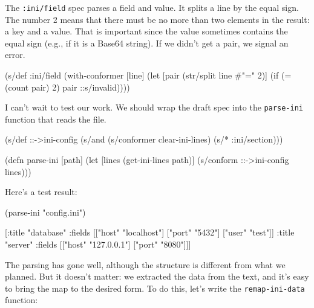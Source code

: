 \else

\begin{english}
\end{english}

\fi


The \verb|:ini/field| spec parses a field and value. It splits a line by the equal sign. The number 2 means that there must be no more than two elements in the result: a key and a value. That is important since the value sometimes contains the equal sign (e.g., if it is a Base64 string). If we didn't get a pair, we signal an error.

\begin{english}
  \begin{clojure}
(s/def :ini/field
  (with-conformer [line]
    (let [pair (str/split line #"=" 2)]
      (if (= (count pair) 2)
        pair
        ::s/invalid))))
  \end{clojure}
\end{english}

I can't wait to test our work. We should wrap the draft spec into the \verb|parse-ini| function that reads the file.

\begin{english}
  \begin{clojure}
(s/def ::->ini-config
  (s/and
   (s/conformer clear-ini-lines)
   (s/* :ini/section)))

(defn parse-ini [path]
  (let [lines (get-ini-lines path)]
    (s/conform ::->ini-config lines)))
  \end{clojure}
\end{english}

\noindent
Here's a test result:

\begin{english}
  \begin{clojure}
(parse-ini "config.ini")

[{:title "database"
  :fields [["host" "localhost"]
           ["port" "5432"]
           ["user" "test"]]}
 {:title "server"
  :fields [["host" "127.0.0.1"]
           ["port" "8080"]]}]
  \end{clojure}
\end{english}

The parsing has gone well, although the structure is different from what we planned. But it doesn't matter: we extracted the data from the text, and it's easy to bring the map to the desired form. To do this, let's write the \verb|remap-ini-data| function:


